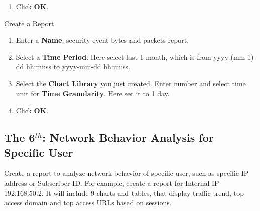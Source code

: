 \begin{description}
\begin{enumerate}
        \item Click \textbf{OK}.
    \end{enumerate}
    \item[STEP 3.]	Create a Report. 
    \begin{enumerate}
        \item Enter a \textbf{Name}, security event bytes and packets report. 
        \item Select a \textbf{Time Period}. Here select last 1 month, which is from yyyy-(mm-1)-dd hh:mi:ss to yyyy-mm-dd hh:mi:ss.
        \item Select the \textbf{Chart Library} you just created. Enter number and select time unit for \textbf{Time Granularity}. Here set it to 1 day.
        \item Click \textbf{OK}.
    \end{enumerate}
\end{description}

\subsection*{\hypertarget{link:The 6th: Network Behavior Analysis for Specific User }{The 6$^{th}$: Network Behavior Analysis for Specific User }}
\label{sec:appendix_f:report:6th}

Create a report to analyze network behavior of specific user, such as specific IP address or Subscriber ID. For example, create a report for Internal IP 192.168.50.2. It will include 9 charts and tables, that display traffic trend, top access domain and top access URLs based on sessions. 

